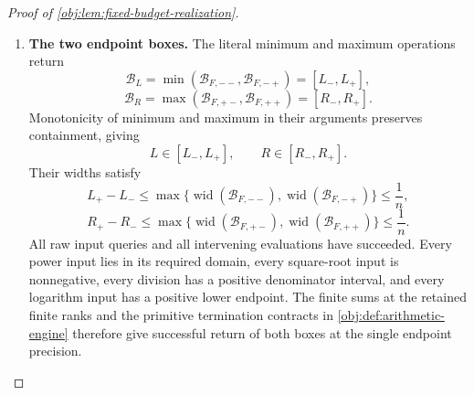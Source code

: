 \documentclass[11pt]{article}
\begin{document}
\begin{proof}[Proof of \cref{obj:lem:fixed-budget-realization}]
\begin{enumerate}
Define the inversion-corner boxes by
\[
\mathcal B_{F,\sigma_c\sigma_s}
=\mathcal B[F(c_{\sigma_c},s_{\sigma_s})].
\]
The logarithm derivative is at most two on every argument interval with lower endpoint at least \(1/2\). Its primitive contract therefore supplies successful boxes containing the four exact corner values, with
\[
\begin{aligned}
\operatorname{wid}(\mathcal B_{F,\sigma_c\sigma_s})
\le{}&
2\left(
512\operatorname{wid}(\mathcal B[c_{\sigma_c}])
+100(K+1)512^2
 \operatorname{wid}(\mathcal B[s_{\sigma_s}])
\right)
+6\epsilon_{\mathrm e}\\
\le{}&
\bigl(307200K^2
+15728640000(K+1)K^2+6\bigr)\epsilon_{\mathrm e}\\
\le{}&2^{37}(K+1)^3\epsilon_{\mathrm e}
\le\frac1n.
\end{aligned}
\]
For the coefficient comparison, \(K\ge0\) implies
\[
K^2\le(K+1)^3,\qquad
(K+1)K^2\le(K+1)^3,\qquad
1\le(K+1)^3,
\]
and
\[
307200+15728640000+6\le2^{37}.
\]
This establishes the required precision for each of the four corner evaluations.

\item \textbf{The two endpoint boxes.}
The literal minimum and maximum operations return
\[
\mathcal B_L
=\min(\mathcal B_{F,--},\mathcal B_{F,-+})
=[L_-,L_+],
\]
\[
\mathcal B_R
=\max(\mathcal B_{F,+-},\mathcal B_{F,++})
=[R_-,R_+].
\]
Monotonicity of minimum and maximum in their arguments preserves containment, giving
\[
L\in[L_-,L_+],
\qquad
R\in[R_-,R_+].
\]
Their widths satisfy
\[
L_+-L_-
\le\max\{
\operatorname{wid}(\mathcal B_{F,--}),
\operatorname{wid}(\mathcal B_{F,-+})\}
\le\frac1n,
\]
\[
R_+-R_-
\le\max\{
\operatorname{wid}(\mathcal B_{F,+-}),
\operatorname{wid}(\mathcal B_{F,++})\}
\le\frac1n.
\]
All raw input queries and all intervening evaluations have succeeded. Every power input lies in its required domain, every square-root input is nonnegative, every division has a positive denominator interval, and every logarithm input has a positive lower endpoint. The finite sums at the retained finite ranks and the primitive termination contracts in \cref{obj:def:arithmetic-engine} therefore give successful return of both boxes at the single endpoint precision.


\end{enumerate}
\end{proof}
\end{document}
